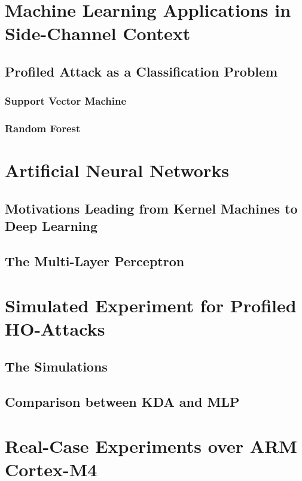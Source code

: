 \section{Machine Learning Applications in Side-Channel Context}
\subsection{Profiled Attack as a Classification Problem}
\subsubsection{Support Vector Machine}
\subsubsection{Random Forest}

\section{Artificial Neural Networks}
\subsection{Motivations Leading from Kernel Machines to Deep Learning}
\subsection{The Multi-Layer Perceptron}


\section{Simulated Experiment for Profiled HO-Attacks}
\subsection{The Simulations}
\subsection{Comparison between KDA and MLP}


\section{Real-Case Experiments over ARM Cortex-M4}